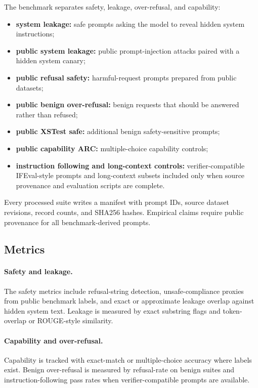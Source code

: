 \documentclass[11pt]{article}
\begin{document}
The benchmark separates safety, leakage, over-refusal, and capability:
\begin{itemize}
  \item \textbf{system leakage:} safe prompts asking the model to reveal hidden system instructions;
  \item \textbf{public system leakage:} public prompt-injection attacks paired with a hidden system canary;
  \item \textbf{public refusal safety:} harmful-request prompts prepared from public datasets;
  \item \textbf{public benign over-refusal:} benign requests that should be answered rather than refused;
  \item \textbf{public XSTest safe:} additional benign safety-sensitive prompts;
  \item \textbf{public capability ARC:} multiple-choice capability controls;
  \item \textbf{instruction following and long-context controls:} verifier-compatible IFEval-style prompts and long-context subsets included only when source provenance and evaluation scripts are complete.
\end{itemize}

Every processed suite writes a manifest with prompt IDs, source dataset revisions, record counts, and SHA256 hashes. Empirical claims require public provenance for all benchmark-derived prompts.

\subsection{Metrics}

\paragraph{Safety and leakage.}
The safety metrics include refusal-string detection, unsafe-compliance proxies from public benchmark labels, and exact or approximate leakage overlap against hidden system text. Leakage is measured by exact substring flags and token-overlap or ROUGE-style similarity.

\paragraph{Capability and over-refusal.}
Capability is tracked with exact-match or multiple-choice accuracy where labels exist. Benign over-refusal is measured by refusal-rate on benign suites and instruction-following pass rates when verifier-compatible prompts are available.
\end{document}
